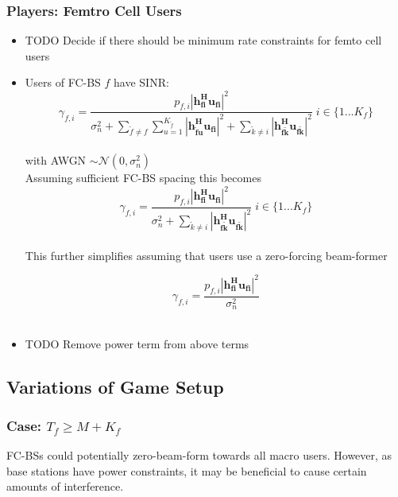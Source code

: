\documentclass[12pt]{article}
\begin{document}
\subsubsection{Players: Femtro Cell Users}
\begin{itemize}


\item TODO Decide if there should be minimum rate constraints for femto cell users
\\

\item Users of FC-BS $f$ have SINR:
\begin{equation}
\gamma_{f,i} = \frac{p_{f,i}|\mathbf{h^H_{fi}u_{fi}}|^2}
{\sigma^2_{n}  + \sum_{\tilde{f}\neq f} \sum_{u=1}^{K_{\tilde{f}}}
|\mathbf{h^H_{\tilde{f}u}u_{fi}}|^2
 + \sum_{\tilde{k}\neq i}
  |\mathbf{h^H_{f\tilde{k}}u_{f\tilde{k}}}|^2}
  \; i \in \{1 ... K_f\}
\end{equation}
\\
with AWGN $\sim \mathcal{N}(0,\sigma^2_n)$
\\

Assuming sufficient FC-BS spacing this becomes 
\begin{equation}
\gamma_{f,i} = \frac{p_{f,i}|\mathbf{h^H_{fi}u_{fi}}|^2}{\sigma^2_{n}   + \sum_{\tilde{k}\neq i}
  |\mathbf{h^H_{f\tilde{k}}u_{f\tilde{k}}}|^2} \; i \in \{1 ... K_f\}
\end{equation}
\\

This further simplifies assuming that users use a zero-forcing beam-former

\begin{equation}
\gamma_{f,i} = \frac{p_{f,i}|\mathbf{h^H_{fi}u_{fi}}|^2}{\sigma^2_{n} }
\end{equation}
\\

\item TODO Remove power term from above terms
\\

\end{itemize}


\subsection{Variations of Game Setup}

\subsubsection{Case: $T_f \geq M + K_f$}
FC-BSs could potentially zero-beam-form towards all macro users. However, as base stations have power constraints, it may be beneficial to cause certain amounts of interference. 
\end{document}

